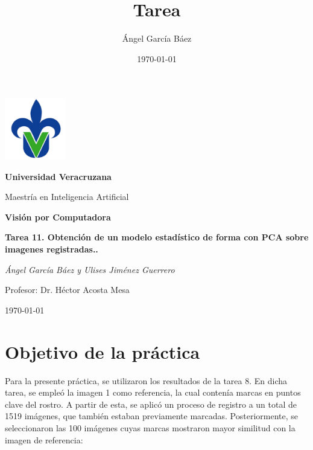 \documentclass[11pt, letterpaper]{article}
\title{\bfseries Tarea}
\author{Ángel García Báez}
\date{\today}
\begin{document}
	
	\begin{titlepage}
		\centering
		\includegraphics[width=0.2\textwidth]{logo.png}\par
		\vspace{1cm}
		{\LARGE \bfseries Universidad Veracruzana \par}
		\vspace{1cm}
		{\Large Maestría en Inteligencia Artificial\par}
		\vspace{3cm}
		{\LARGE \bfseries Visión por Computadora \par}
		\vspace{1cm}
		{\Large \bfseries Tarea 11. Obtención de un modelo estadístico de forma con PCA sobre imagenes registradas.. \par}
		\vfill
		{\Large \textit{Ángel García Báez y Ulises Jiménez Guerrero}\par}
		\vspace{1cm}
		{\Large Profesor: Dr. Héctor Acosta Mesa \par}
		\vfill
		{\Large \today \par}
	\end{titlepage}
	
	\newpage
	\tableofcontents
	\newpage
	
\section{Objetivo de la práctica}

Para la presente práctica, se utilizaron los resultados de la tarea 8. En dicha tarea, se empleó la imagen 1 como referencia, la cual contenía marcas en puntos clave del rostro. A partir de esta, se aplicó un proceso de registro a un total de 1519 imágenes, que también estaban previamente marcadas. Posteriormente, se seleccionaron las 100 imágenes cuyas marcas mostraron mayor similitud con la imagen de referencia:
\end{document}
